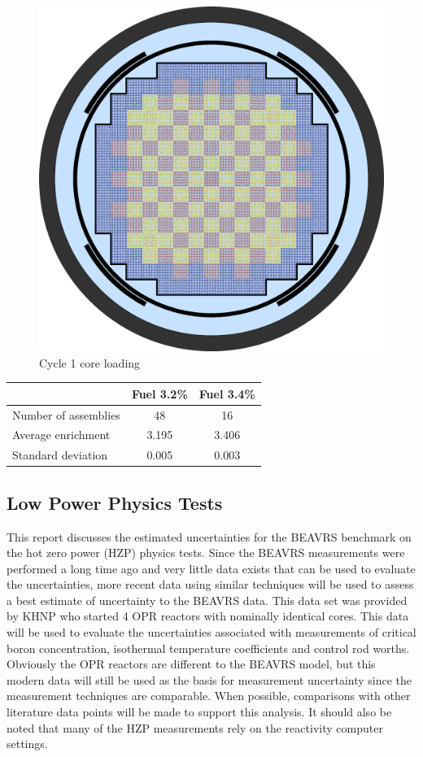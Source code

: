 \documentclass{article}
\begin{document}
\begin{figure}
\centering
\includegraphics[keepaspectratio, width = 4.0 in]{figures/pwr_core.png}
\caption{Cycle 1 core loading}
\label{fig:cycle1_map}
\end{figure}

\begin{center}
\begin{tabular}{ l c c}
\hline
  & Fuel 3.2\% & Fuel 3.4\% \\
\hline  
  Number of assemblies & 48 & 16\\
  Average enrichment & 3.195 & 3.406 \\
  Standard deviation & 0.005 & 0.003 \\
\hline  
\end{tabular}
\end{center}

\subsection{Low Power Physics Tests}

This report discusses the estimated uncertainties for the BEAVRS benchmark on the hot zero power (HZP) physics tests.  Since the BEAVRS measurements were performed a long time ago and very little data exists that can be used to evaluate the uncertainties, more recent data using similar techniques will be used to assess a best estimate of uncertainty to the BEAVRS data.  This data set was provided by KHNP who started 4 OPR reactors with nominally identical cores.  This data will be used to evaluate the uncertainties associated with measurements of critical boron concentration, isothermal temperature coefficients and control rod worths.  Obviously the OPR reactors are different to the BEAVRS model, but this modern data will still be used as the basis for measurement uncertainty since the measurement techniques are comparable.  When possible, comparisons with other literature data points will be made to support this analysis.  It should also be noted that many of the HZP measurements rely on the reactivity computer settings.
\end{document}
